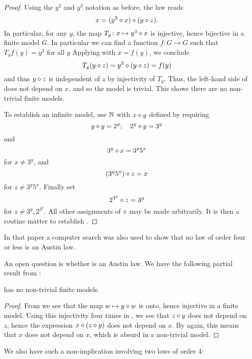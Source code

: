 \begin{proof} Using the $y^2$ and $y^3$ notation as before, the law reads
\begin{equation}\label{kis2-law}
   x = (y^3 \diamond x) \diamond (y \diamond z).
  \end{equation}
In particular, for any $y$, the map $T_y \colon x \mapsto y^3 \diamond x$ is injective, hence bijective in a finite model $G$.  In particular we can find a function $f : G \to G$ such that $T_y f(y) = y^3$ for all $y$  Applying  with $x = f(y)$, we conclude
$$ T_y(y \diamond z) = y^3 \diamond (y \diamond z) = f(y) $$
and thus $y \diamond z$ is independent of $z$ by injectivity of $T_y$.  Thus, the left-hand side of  does not depend on $x$, and so the model is trivial.  This shows there are no non-trivial finite models.

To establish an infinite model, use $\mathbb{N}$ with $x \diamond y$ defined by requiring
$$ y \diamond y = 2^y; \quad 2^y \diamond y = 3^y$$
and
$$ 3^y \diamond x = 3^y 5^x$$
for $x \neq 3^y$, and
$$ (3^y 5^x) \diamond z = x$$
for $z \neq 3^y 5^x$.  Finally set
$$ 2^{3^y} \diamond z = 3^y$$
for $z \neq 3^y, 2^{3^y}$.  All other assignments of $\diamond$ may be made arbitrarily. It is then a routine matter to establish .
\end{proof}

In that paper a computer search was also used to show that no law of order four or less is an Austin law.

An open question is whether  is an Austin law.  We have the following partial result from \cite{Kisielewicz2}:

\begin{theorem}\leanok\label{5105-nontrivial}  has no non-trivial finite models.
\end{theorem}

\begin{proof} \leanok From  we see that the map $w \mapsto y \diamond w$ is onto, hence injective in a finite model.  Using this injectivity four times in , we see that $z \diamond y$ does not depend on $z$, hence the expression
$x \diamond (z \diamond y)$ does not depend on $x$.  By  again, this means that $x$ does not depend on $x$, which is absurd in a non-trivial model.
\end{proof}

We also have such a non-implication involving two laws of order $4$:

